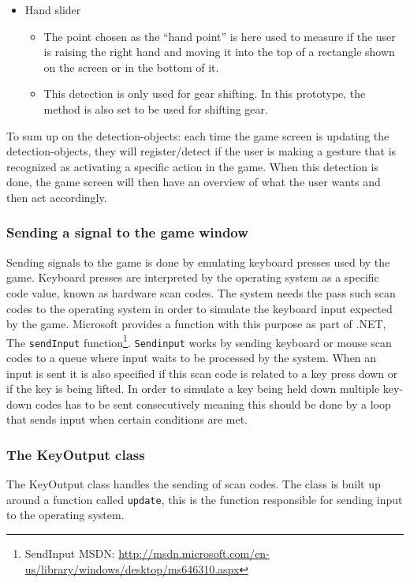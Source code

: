 \begin{itemize}
\item Hand slider
	\begin{itemize}
	\item The point chosen as the “hand point” is here used to measure if the user is raising the right hand and moving it into the top of a rectangle shown on the screen or in the bottom of it.
	
	\item This detection is only used for gear shifting. In this prototype, the method is also set to be used for shifting gear.
	\end{itemize}
\end{itemize}

To sum up on the detection-objects: each time the game screen is updating the detection-objects, they will register/detect if the user is making a gesture that is recognized as activating a specific action in the game. 
When this detection is done, the game screen will then have an overview of what the user wants and then act accordingly. 


\subsubsection*{Sending a signal to the game window}
Sending signals to the game is done by emulating keyboard presses used by the game. 
Keyboard presses are interpreted by the operating system as a specific code value, known as hardware scan codes. 
The system needs the pass such scan codes to the operating system in order to simulate the keyboard input expected
by the game. 
Microsoft provides a function with this purpose as part of .NET, The \texttt{sendInput} function\footnote{SendInput MSDN: \url{http://msdn.microsoft.com/en-us/library/windows/desktop/ms646310.aspx}}.
\texttt{Sendinput} works by sending keyboard or mouse scan codes to a queue where input waits to be processed by the
system. 
When an input is sent it is also specified if this scan code is related to a key press down or if the key is being lifted. 
In order to simulate a key being held down multiple key-down codes has to be sent consecutively meaning this should be done by a loop that sends input when certain conditions are met.

\subsubsection*{The KeyOutput class}
The KeyOutput class handles the sending of scan codes. The class is built up around a function called \texttt{update}, this is the function responsible for sending input to the operating system.
\bigskip

